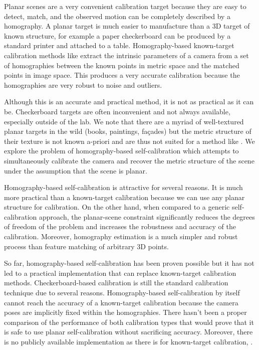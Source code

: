 \documentclass[10pt,twocolumn,letterpaper]{article}
\begin{document}
Planar scenes are a very convenient calibration target because they are easy to detect, match, and the observed motion can be completely described by a homography. A planar target is much easier to manufacture than a 3D target of known structure, for example a paper checkerboard can be produced by a standard printer and attached to a table. Homography-based known-target calibration methods like \cite{sturm1999,zhang1999} extract the intrinsic parameters of a camera from a set of homographies between the known points in metric space and the matched points in image space. This produces a very accurate calibration because the homographies are very robust to noise and outliers. 

Although this is an accurate and practical method, it is not as practical as it can be. Checkerboard targets are often inconvenient and not always available, especially outside of the lab. We note that there are a myriad of well-textured planar targets in the wild (books, paintings, fa\c{c}ades) but the metric structure of their texture is not known a-priori and are thus not suited for a method like \cite{zhang1999}. We explore the problem of homography-based self-calibration which attempts to simultaneously calibrate the camera and recover the metric structure of the scene under the assumption that the scene is planar.

Homography-based self-calibration is attractive for several reasons. It is much more practical than a known-target calibration because we can use any planar structure for calibration. On the other hand, when compared to a generic self-calibration approach, the planar-scene constraint significantly reduces the degrees of freedom of the problem and increases the robustness and accuracy of the calibration. Moreover, homography estimation is a much simpler and robust process than feature matching of arbitrary 3D points.

So far, homography-based self-calibration has been proven possible \cite{triggs1998} but it has not led to a practical implementation that can replace known-target calibration methods. Checkerboard-based calibration is still the standard calibration technique due to several reasons. Homography-based self-calibration by itself cannot reach the accuracy of a known-target calibration because the camera poses are implicitly fixed within the homographies. There hasn't been a proper comparison of the performance of both calibration types that would prove that it is safe to use planar self-calibration without sacrificing accuracy. Moreover, there is no publicly available implementation as there is for known-target calibration, \eg \cite{bouguetMCT}. 
\end{document}
